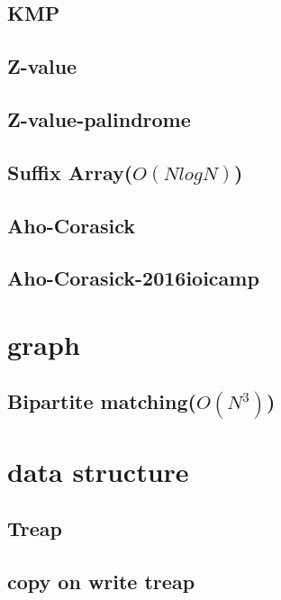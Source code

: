 \documentclass[12pt,twocolumn,oneside]{article}
\begin{document}
\subsection{KMP}


\subsection{Z-value}


\subsection{Z-value-palindrome}


\subsection{Suffix Array(\(O(N log N)\))}


\subsection{Aho-Corasick}


\subsection{Aho-Corasick-2016ioicamp}


\section{graph}
\subsection{Bipartite matching(\(O(N^3)\))}


\section{data structure}
\subsection{Treap}


\subsection{copy on write treap}

\end{document}
